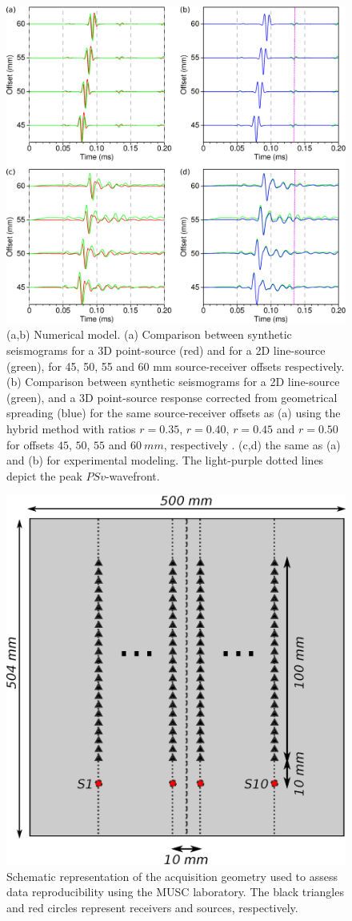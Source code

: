 \documentclass[extra,mreferee]{gji}
\begin{document}
\begin{figure}
\centering
\includegraphics[width=1.0\columnwidth]{Fig/Fig07.eps}
\caption{(a,b) Numerical model. (a) Comparison between synthetic seismograms for a 3D point-source (red) and for a 2D line-source (green), for 45, 50, 55 and 60 mm source-receiver offsets respectively. (b) Comparison between synthetic seismograms for a 2D line-source (green), and a 3D point-source response corrected from geometrical spreading (blue) for the same source-receiver offsets as (a) using the hybrid method with ratios $r=0.35$, $r=0.40$, $r=0.45$ and $r=0.50$ for offsets $45$, $50$, $55$ and $60\ mm$, respectively . (c,d) the same as (a) and (b) for experimental modeling. The light-purple dotted lines depict the peak $PSv$-wavefront.}%
\label{Fig:Fig07}
\end{figure}

\clearpage
\newpage

\begin{figure}
\centering
\includegraphics[width=0.50\columnwidth]{Fig/Fig08.eps}
\caption{Schematic representation of the acquisition geometry used to assess data reproducibility using the MUSC laboratory. The black triangles and red circles represent receivers and sources, respectively.}
\label{Fig:Fig08}
\end{figure}
\end{document}
